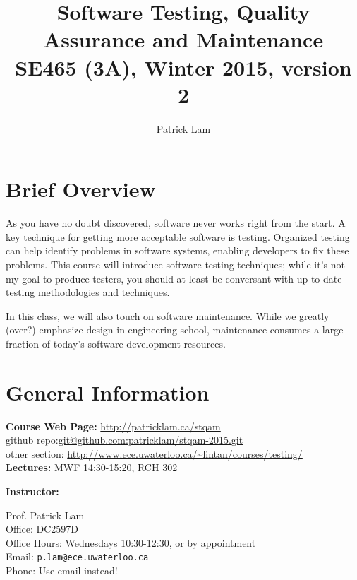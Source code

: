 \documentclass{article}
\begin{document}
\title{Software Testing, Quality Assurance and Maintenance\\SE465 (3A), Winter 2015, version 2}
\author{Patrick Lam}
\renewcommand{\today}{}
\maketitle
\vspace*{-2em}

\section*{Brief Overview}
As you have no doubt discovered, software never works right from the
start. A key technique for getting more acceptable software is
testing. Organized testing can help identify problems in software
systems, enabling developers to fix these problems.  This course will
introduce software testing techniques; while it's not my goal
to produce testers, you should at least be conversant
with up-to-date testing methodologies and techniques.

In this class, we will also touch on software maintenance. While we
greatly (over?) emphasize design in engineering school, maintenance
consumes a large fraction of today's software development resources.

\section*{General Information}

\noindent
\begin{tabbing}
  {\bf Course Web Page:} \= \url{http://patricklam.ca/stqam}\\
  github repo:\= \url{git@github.com:patricklam/stqam-2015.git}\\
  other section: \> \url{http://www.ece.uwaterloo.ca/~lintan/courses/testing/} \\
  {\bf Lectures:} \> MWF 14:30-15:20, RCH 302
\end{tabbing}

\noindent
{\bf Instructor:} \\

\noindent
\hspace*{2em} \begin{minipage}{.6\textwidth}
Prof. Patrick Lam\\
Office: DC2597D\\
Office Hours: Wednesdays 10:30-12:30, or by appointment\\
Email: {\tt p.lam@ece.uwaterloo.ca}\\
Phone: Use email instead!

\end{minipage} \\[1em]
\end{document}
